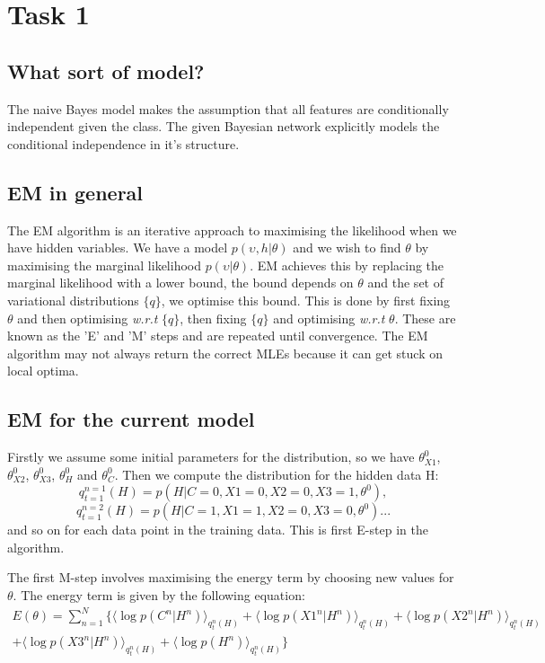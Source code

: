\documentclass[12pt]{article} %
\begin{document}
\section{Task 1} %


\subsection{What sort of model?} %
The naive Bayes model makes the assumption that all features are conditionally independent given the class. The given Bayesian network explicitly models the conditional independence in it's structure.

\subsection{EM in general}
The EM algorithm is an iterative approach to maximising the likelihood when we have hidden variables. We have a model $p(\upsilon,h|\theta)$ and we wish to find $\theta$ by maximising the marginal likelihood $p(\upsilon|\theta)$. EM achieves this by replacing the marginal likelihood with a lower bound, the bound depends on $\theta$ and the set of variational distributions $\{q\}$, we optimise this bound. This is done by first fixing $\theta$ and then optimising \textit{w.r.t} $\{q\}$, then fixing $\{q\}$ and optimising \textit{w.r.t} $\theta$. These are known as the 'E' and 'M' steps and are repeated until convergence. The EM algorithm may not always return the correct MLEs because it can get stuck on local optima.

\subsection{EM for the current model}
Firstly we assume some initial parameters for the distribution, so we have $\theta_{X1}^0$, $\theta_{X2}^0$, $\theta_{X3}^0$, $\theta_{H}^0$ and $\theta_{C}^0$. Then we compute the distribution for the hidden data H:
$$
q_{t=1}^{n=1}(H)=p(H|C=0,X1=0,X2=0,X3=1,\theta^0),
$$
$$
q_{t=1}^{n=2}(H)=p(H|C=1,X1=1,X2=0,X3=0,\theta^0)...
$$
and so on for each data point in the training data. This is first E-step in the algorithm.

The first M-step involves maximising the energy term by choosing new values for $\theta$. The energy term is given by the following equation:
\begin{multline}
E(\theta) = \displaystyle\sum_{n=1}^{N}
\{
\langle\log p(C^n|H^n) \rangle_{q_t^n(H)} +
\langle\log p(X1^n|H^n) \rangle_{q_t^n(H)} + 
\langle\log p(X2^n|H^n) \rangle_{q_t^n(H)} \\ +
\langle\log p(X3^n|H^n) \rangle_{q_t^n(H)} + 
\langle\log p(H^n) \rangle_{q_t^n(H)}
\}
\end{multline}
\end{document}
